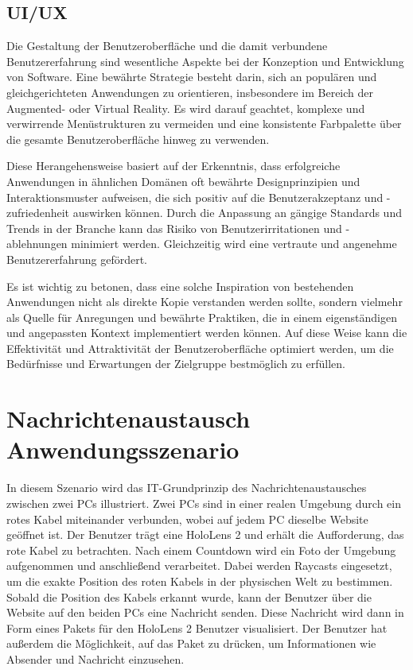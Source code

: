 \subsection{UI/UX}
Die Gestaltung der Benutzeroberfläche und die damit verbundene Benutzererfahrung sind wesentliche Aspekte bei der Konzeption und Entwicklung von Software. Eine bewährte Strategie besteht darin, sich an populären und gleichgerichteten Anwendungen zu orientieren, insbesondere im Bereich der Augmented- oder Virtual Reality. Es wird darauf geachtet, komplexe und verwirrende Menüstrukturen zu vermeiden und eine konsistente Farbpalette über die gesamte Benutzeroberfläche hinweg zu verwenden.

Diese Herangehensweise basiert auf der Erkenntnis, dass erfolgreiche Anwendungen in ähnlichen Domänen oft bewährte Designprinzipien und Interaktionsmuster aufweisen, die sich positiv auf die Benutzerakzeptanz und -zufriedenheit auswirken können. Durch die Anpassung an gängige Standards und Trends in der Branche kann das Risiko von Benutzerirritationen und -ablehnungen minimiert werden. Gleichzeitig wird eine vertraute und angenehme Benutzererfahrung gefördert.

Es ist wichtig zu betonen, dass eine solche Inspiration von bestehenden Anwendungen nicht als direkte Kopie verstanden werden sollte, sondern vielmehr als Quelle für Anregungen und bewährte Praktiken, die in einem eigenständigen und angepassten Kontext implementiert werden können. Auf diese Weise kann die Effektivität und Attraktivität der Benutzeroberfläche optimiert werden, um die Bedürfnisse und Erwartungen der Zielgruppe bestmöglich zu erfüllen.





\section{\label{sec:jonasSzenario}Nachrichtenaustausch Anwendungsszenario} 
In diesem Szenario wird das IT-Grundprinzip des Nachrichtenaustausches zwischen zwei PCs illustriert. Zwei PCs sind in einer realen Umgebung durch ein rotes Kabel miteinander verbunden, wobei auf jedem PC dieselbe Website geöffnet ist. Der Benutzer trägt eine HoloLens 2 und erhält die Aufforderung, das rote Kabel zu betrachten. Nach einem Countdown wird ein Foto der Umgebung aufgenommen und anschließend verarbeitet. Dabei werden Raycasts eingesetzt, um die exakte Position des roten Kabels in der physischen Welt zu bestimmen. Sobald die Position des Kabels erkannt wurde, kann der Benutzer über die Website auf den beiden PCs eine Nachricht senden. Diese Nachricht wird dann in Form eines Pakets für den HoloLens 2 Benutzer visualisiert. Der Benutzer hat außerdem die Möglichkeit, auf das Paket zu drücken, um Informationen wie Absender und Nachricht einzusehen.

